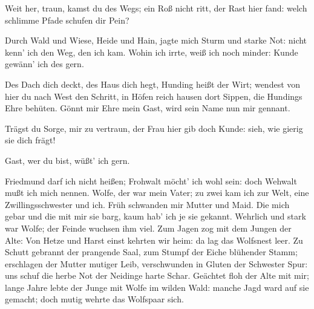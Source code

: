 \begin{drama}
Weit her, traun, kamst du des Wegs;
ein Roß nicht ritt, der Rast hier fand:
welch schlimme Pfade schufen dir Pein?
 

\Siegmundspeaks
Durch Wald und Wiese, Heide und Hain,
jagte mich Sturm und starke Not:
nicht kenn' ich den Weg, den ich kam.
Wohin ich irrte, weiß ich noch minder:
Kunde gewänn' ich des gern.
 

\Hundingspeaks


Des Dach dich deckt, des Haus dich hegt,
Hunding heißt der Wirt;
wendest von hier du nach West den Schritt,
in Höfen reich hausen dort Sippen,
die Hundings Ehre behüten.
Gönnt mir Ehre mein Gast,
wird sein Name nun mir gennant.
 




\Hundingspeaks


Trägst du Sorge, mir zu vertraun,
der Frau hier gib doch Kunde:
sieh, wie gierig sie dich frägt!
 

\Sieglindespeaks


Gast, wer du bist, wüßt' ich gern.
 

\Siegmundspeaks


Friedmund darf ich nicht heißen;
Frohwalt möcht' ich wohl sein:
doch Wehwalt mußt ich mich nennen.
Wolfe, der war mein Vater;
zu zwei kam ich zur Welt,
eine Zwillingsschwester und ich.
Früh schwanden mir Mutter und Maid.
Die mich gebar und die mit mir sie barg,
kaum hab' ich je sie gekannt.
Wehrlich und stark war Wolfe;
der Feinde wuchsen ihm viel.
Zum Jagen zog mit dem Jungen der Alte:
Von Hetze und Harst einst kehrten wir heim:
da lag das Wolfsnest leer.
Zu Schutt gebrannt der prangende Saal,
zum Stumpf der Eiche blühender Stamm;
erschlagen der Mutter mutiger Leib,
verschwunden in Gluten der Schwester Spur:
uns schuf die herbe Not
der Neidinge harte Schar.
Geächtet floh der Alte mit mir;
lange Jahre lebte der Junge
mit Wolfe im wilden Wald:
manche Jagd ward auf sie gemacht;
doch mutig wehrte das Wolfspaar sich.
 



\end{drama}
